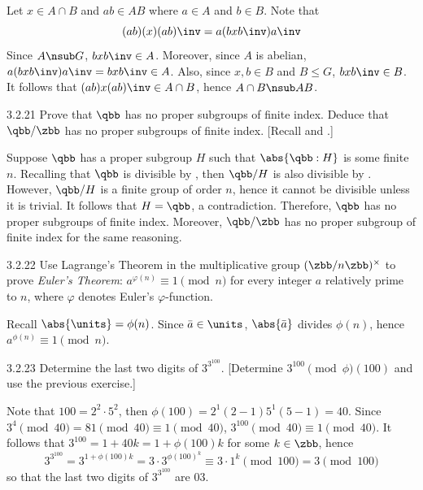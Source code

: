 \begin{sol}
    Let $x \in A \cap B$ and $ab \in AB$ where $a \in A$ and $b \in B$.
	Note that
    \[
    	(ab)(x)(ab)\inv = a(bxb\inv)a\inv
    \]
    Since $A \nsub G$, $bxb\inv \in A$.
	Moreover, since $A$ is abelian, $a(bxb\inv)a\inv = bxb\inv \in A$.
	Also, since $x, b \in B$ and $B \leq G$, $bxb\inv \in B$.
	It follows that $(ab)x(ab)\inv \in A \cap B$, hence $A \cap B \nsub AB$.
\end{sol}

\begin{exercise}{3.2.21}
    Prove that $\qbb$ has no proper subgroups of finite index.
	Deduce that $\qbb/\zbb$ has no proper subgroups of finite index. [Recall  and .]
\end{exercise}

\begin{sol}
    Suppose $\qbb$ has a proper subgroup $H$ such that $\abs{\qbb : H}$ is some finite $n$.
	Recalling that $\qbb$ is divisible by , then $\qbb/H$ is also divisible by .
	However, $\qbb/H$ is a finite group of order $n$, hence it cannot be divisible unless it is trivial.
	It follows that $H = \qbb$, a contradiction.
	Therefore, $\qbb$ has no proper subgroups of finite index.
	Moreover, $\qbb/\zbb$ has no proper subgroup of finite index for the same reasoning.
\end{sol}

\begin{exercise}{3.2.22}
    Use Lagrange's Theorem in the multiplicative group $(\zbb/n\zbb)^\times$ to prove \emph{Euler's Theorem}: $a^{\varphi(n)} \equiv 1 \pmod n$ for every integer $a$ relatively prime to $n$, where $\varphi$ denotes Euler's $\varphi$-function.
\end{exercise}

\begin{sol}
    Recall $\abs{\units} = \phi(n)$.
	Since $\bar a \in \units$, $\abs{\bar a}$ divides $\phi(n)$, hence $a^{\phi(n)} \equiv 1 \pmod n$.
\end{sol}

\begin{exercise}{3.2.23}
    Determine the last two digits of $3^{3^{100}}$. [Determine $3^{100} \pmod \phi(100)$ and use the previous exercise.]
\end{exercise}

\begin{sol}
    Note that $100 = 2^2 \cdot 5^2$, then $\phi(100) = 2^1(2 - 1)5^1(5 - 1) = 40$.
	Since $3^4 \pmod 40 = 81 \pmod 40 \equiv 1 \pmod 40$, $3^{100} \pmod 40 \equiv 1 \pmod 40$.
	It follows that $3^{100} = 1 + 40k = 1 + \phi(100)k$ for some $k \in \zbb$, hence
    \[
    	3^{3^{100}} = 3^{1 + \phi(100)k} = 3 \cdot 3^{{\phi(100)}^k} \equiv 3 \cdot 1^k \pmod 100 = 3 \pmod 100
    \]
    so that the last two digits of $3^{3^{100}}$ are 03.
\end{sol}